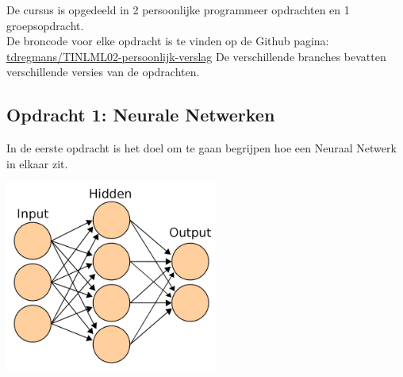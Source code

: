 \documentclass{article} %
\begin{document}
        De cursus is opgedeeld in 2 persoonlijke programmeer opdrachten en 1 groepsopdracht. \\
        De broncode voor elke opdracht is te vinden op de Github pagina: \href{https://github.com/tdregmans/TINLML02-persoonlijk-verslag}{tdregmans/TINLML02-persoonlijk-verslag} De verschillende branches bevatten verschillende versies van de opdrachten.

        \subsection{Opdracht 1: Neurale Netwerken}
        
            In de eerste opdracht is het doel om te gaan begrijpen hoe een Neuraal Netwerk in elkaar zit. \\
            \begin{center}
                \includegraphics[width=7cm]{nn.png}
            \end{center} 
            
\end{document}

